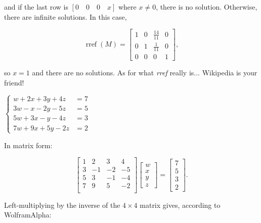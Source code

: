 \documentclass[../key.tex]{subfiles}
\begin{document}
and if the last row is $[0\quad 0 \quad 0 \quad x]$ where $x \neq 0$, there is no solution. Otherwise, there are infinite solutions. In this case,

$$\operatorname{rref} (M) = \begin{bmatrix} 1 & 0 & \frac{14}{11} & 0 \\ 0 & 1 & \frac{1}{11} & 0 \\ 0 & 0 & 0 & 1 \end{bmatrix},$$

so $x=1$ and there are no solutions. As for what \textit{rref} really is... Wikipedia is your friend!

\begin{inner_problem}
\item $\begin{cases} w + 2x + 3y + 4z &= 7 \\ 3w-x-2y-5z&=5 \\ 5w+3x-y-4z&=3 \\ 7w+9x+5y-2z&=2\end{cases}$
\end{inner_problem}

In matrix form:

$$\begin{bmatrix}
1 & 2 & 3 & 4 \\
3 & -1 & -2 & -5 \\
5 & 3 & -1 & -4 \\
7 & 9 & 5 & -2 \\
\end{bmatrix}\begin{bmatrix} w \\ x \\ y \\ z \end{bmatrix} =
\begin{bmatrix}
  7 \\ 5 \\ 3 \\ 2
\end{bmatrix}.$$

Left-multiplying by the inverse of the $4\times 4$ matrix gives, according to WolframAlpha:
\end{document}
